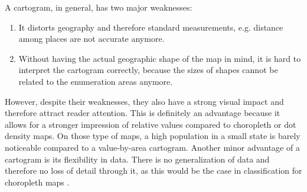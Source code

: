 A cartogram, in general, has two major weaknesses:
\begin{enumerate}
\item It distorts geography and therefore standard measurements, e.g. distance among places are not accurate anymore.
\item Without having the actual geographic shape of the map in mind, it is hard to interpret the cartogram correctly, because the sizes of shapes cannot be related to the enumeration areas anymore.
\end{enumerate}

However, despite their weaknesses, they also have a strong visual impact and therefore attract reader attention. This is definitely an advantage because it allows for a stronger impression of relative values compared to choropleth or dot density maps. On those type of maps, a high population in a small state is barely noticeable compared to a value-by-area cartogram.
Another minor advantage of a cartogram is its flexibility in data. There is no generalization of data and therefore no loss of detail through it, as this would be the case in classification for choropleth maps .

